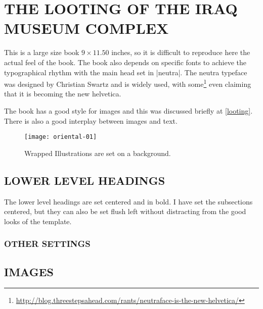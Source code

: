 \chapter{THE LOOTING OF THE IRAQ MUSEUM COMPLEX}

This is a large size book $9\times11.50$ inches, so it is difficult to reproduce here the actual feel of the book. The book also depends on specific fonts to achieve the typographical rhythm with the main head set in |neutra|. The neutra typeface was designed by Christian Swartz and is widely used, with some\footnote{\protect\url{http://blog.threestepsahead.com/rants/neutraface-is-the-new-helvetica/}} even claiming that it is becoming the new helvetica.

The book has a good style for images and this was discussed briefly at \autoref{looting}. There is also a good interplay between images and text.



\begin{figure}[p]
\centering
\texttt{[image: oriental-01]}
\caption{Wrapped Illustrations are set on a background.}
\end{figure}




          
\section{LOWER LEVEL HEADINGS}

The lower level headings are set centered and in bold. I have set the subsections centered, but they can also be set flush left without distracting from the good looks of the template.

\subsection{OTHER SETTINGS}
\lorem \lorem

\section{IMAGES}




